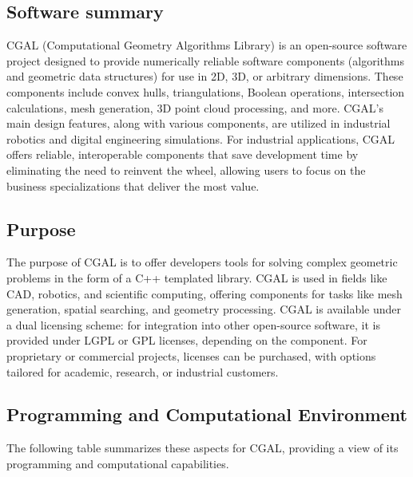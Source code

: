 \subsection{Software summary}
\label{sec:CGAL:summary}

CGAL (Computational Geometry Algorithms Library) \cite{the_cgal_project_cgal_2024} is an open-source software project designed to provide 
numerically reliable software components (algorithms and geometric data structures) for use in 2D, 3D, or arbitrary dimensions.
These components include convex hulls, triangulations, Boolean operations, intersection calculations, mesh generation, 
3D point cloud processing, and more. CGAL’s main design features, along with various components, are utilized in industrial 
robotics and digital engineering simulations. For industrial applications, CGAL offers reliable, interoperable components 
that save development time by eliminating the need to reinvent the wheel, allowing users to focus on the business specializations 
that deliver the most value.




\subsection{Purpose}
\label{sec:CGAL:purpose}

The purpose of CGAL is to offer developers tools for solving complex geometric problems in the form of a C++ templated library. 
CGAL is used in fields like CAD, robotics, and scientific computing, offering components for tasks like mesh generation, 
spatial searching, and geometry processing. CGAL is available under a dual licensing scheme: for integration into other open-source software, 
it is provided under LGPL or GPL licenses, depending on the component. For proprietary or commercial projects, 
licenses can be purchased, with options tailored for academic, research, or industrial customers.

\subsection{Programming and Computational Environment}
\label{sec::CGAL:environment_capabilities}



The following table summarizes these aspects for CGAL, providing a  view of its programming and computational capabilities.

